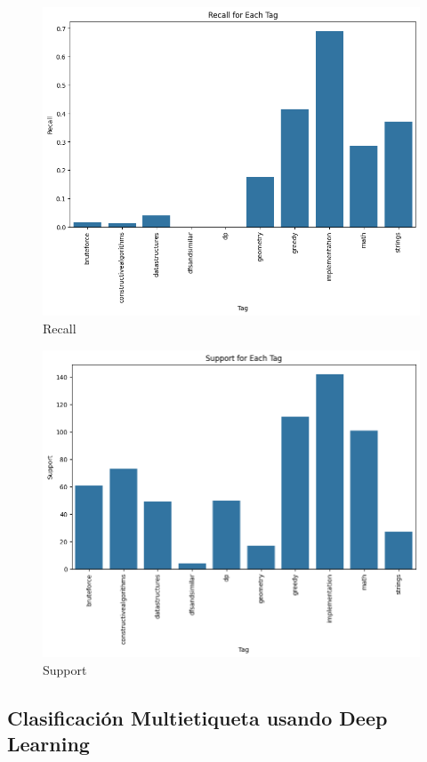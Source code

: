 \documentclass{article}
\begin{document}
\begin{figure}[H]
    \centering
    \includegraphics[scale=0.49]{imgs/recallnb.png}
    \caption{Recall}
    \label{fig:r}
\end{figure}
\begin{figure}[H]
    \centering
    \includegraphics[scale=0.49]{imgs/supportnb.png}
    \caption{Support}
    \label{fig:s}
\end{figure}

\subsection{Clasificación Multietiqueta usando Deep Learning}
\end{document}

